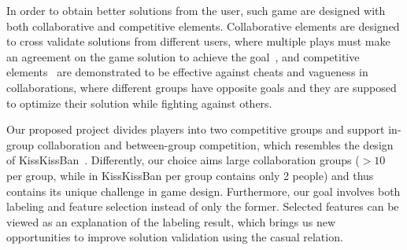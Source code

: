 In order to obtain better solutions from the user, such game are designed with both collaborative and competitive elements. Collaborative elements are designed to cross validate solutions from different users, where multiple plays must make an agreement on the game solution to achieve the goal~\cite{vonAhn:2006:PGL:1124772.1124782}, and competitive elements~\cite{ho2009kisskissban} are demonstrated to be effective against cheats and vagueness in collaborations, where different groups have opposite goals and they are supposed to optimize their solution while fighting against others.

Our proposed project divides players into two competitive groups and support in-group collaboration and between-group competition, which resembles the design of KissKissBan~\cite{ho2009kisskissban}. Differently, our choice aims large collaboration groups ($> 10$ per group, while in KissKissBan per group contains only 2 people) and thus contains its unique challenge in game design. Furthermore, our goal involves both labeling and feature selection instead of only the former. Selected features can be viewed as an explanation of the labeling result, which brings us new opportunities to improve solution validation using the casual relation. 

